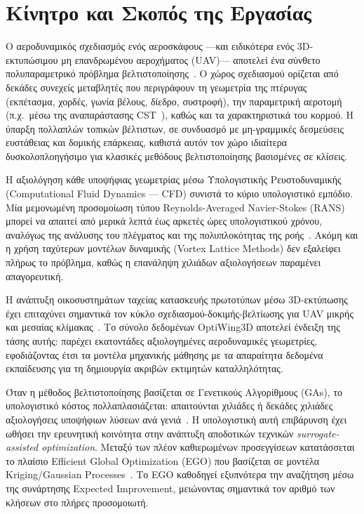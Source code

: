 \section{Κίνητρο και Σκοπός της Εργασίας}
\label{sec:intro_motivation}

Ο αεροδυναμικός σχεδιασμός ενός αεροσκάφους ---και ειδικότερα ενός 3D-εκτυπώσιμου μη επανδρωμένου αεροχήματος (UAV)--- αποτελεί ένα σύνθετο πολυπαραμετρικό πρόβλημα βελτιστοποίησης~\cite{goldberg1989genetic}. Ο χώρος σχεδιασμού ορίζεται από δεκάδες συνεχείς μεταβλητές που περιγράφουν τη γεωμετρία της πτέρυγας (εκπέτασμα, χορδές, γωνία βέλους, δίεδρο, συστροφή), την παραμετρική αεροτομή (π.χ.\ μέσω της αναπαράστασης CST~\cite{kulfan2008cst}), καθώς και τα χαρακτηριστικά του κορμού. Η ύπαρξη πολλαπλών τοπικών βέλτιστων, σε συνδυασμό με μη-γραμμικές δεσμεύσεις ευστάθειας και δομικής επάρκειας, καθιστά αυτόν τον χώρο ιδιαίτερα δυσκολοπλοηγήσιμο για κλασικές μεθόδους βελτιστοποίησης βασισμένες σε κλίσεις.

Η αξιολόγηση κάθε υποψήφιας γεωμετρίας μέσω Υπολογιστικής Ρευστοδυναμικής (Computational Fluid Dynamics --- CFD) συνιστά το κύριο υπολογιστικό εμπόδιο. Μία μεμονωμένη προσομοίωση τύπου Reynolds-Averaged Navier-Stokes (RANS) μπορεί να απαιτεί από μερικά λεπτά έως αρκετές ώρες υπολογιστικού χρόνου, αναλόγως της ανάλυσης του πλέγματος και της πολυπλοκότητας της ροής~\cite{abbott1959theory}. Ακόμη και η χρήση ταχύτερων μοντέλων δυναμικής (Vortex Lattice Methods) δεν εξαλείφει πλήρως το πρόβλημα, καθώς η επανάληψη χιλιάδων αξιολογήσεων παραμένει απαγορευτική.

Η ανάπτυξη οικοσυστημάτων ταχείας κατασκευής πρωτοτύπων μέσω 3D-εκτύπωσης έχει επιταχύνει σημαντικά τον κύκλο σχεδιασμού-δοκιμής-βελτίωσης για UAV μικρής και μεσαίας κλίμακας~\cite{diniz2025optiwing3d}. Το σύνολο δεδομένων OptiWing3D αποτελεί ένδειξη της τάσης αυτής: παρέχει εκατοντάδες αξιολογημένες αεροδυναμικές γεωμετρίες, εφοδιάζοντας έτσι τα μοντέλα μηχανικής μάθησης με τα απαραίτητα δεδομένα εκπαίδευσης για τη δημιουργία ακριβών εκτιμητών καταλληλότητας.

Όταν η μέθοδος βελτιστοποίησης βασίζεται σε Γενετικούς Αλγορίθμους (GAs), το υπολογιστικό κόστος πολλαπλασιάζεται: απαιτούνται χιλιάδες ή δεκάδες χιλιάδες αξιολογήσεις υποψήφιων λύσεων ανά γενιά~\cite{jin2011surrogate}. Η υπολογιστική αυτή επιβάρυνση έχει ωθήσει την ερευνητική κοινότητα στην ανάπτυξη αποδοτικών τεχνικών \emph{surrogate-assisted optimization}. Μεταξύ των πλέον καθιερωμένων προσεγγίσεων κατατάσσεται το πλαίσιο Efficient Global Optimization (EGO) που βασίζεται σε μοντέλα Kriging/Gaussian Processes~\cite{jones1998ego,forrester2008engineering}. Το EGO καθοδηγεί εξυπνότερα την αναζήτηση μέσω της συνάρτησης Expected Improvement, μειώνοντας σημαντικά τον αριθμό των κλήσεων στο πλήρες προσομοιωτή.

